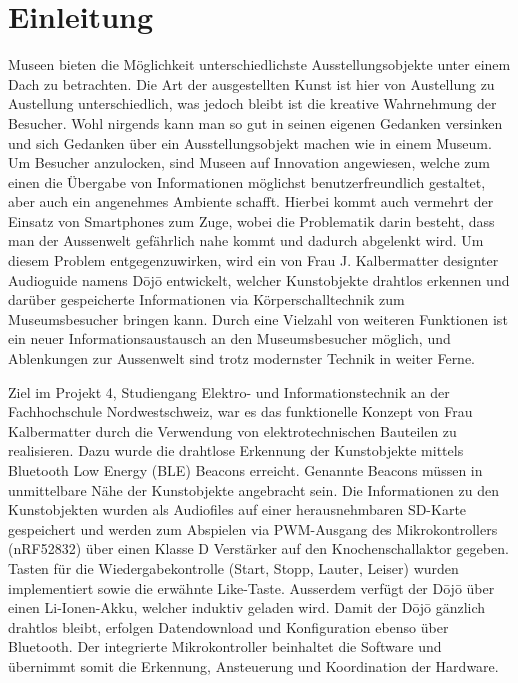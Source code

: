 \section{Einleitung}\label{sec:einleitung}

Museen bieten die Möglichkeit unterschiedlichste Ausstellungsobjekte unter einem Dach zu betrachten. Die Art der ausgestellten Kunst ist hier von Austellung zu Austellung unterschiedlich, was jedoch bleibt ist die kreative Wahrnehmung der Besucher. Wohl nirgends kann man so gut in seinen eigenen Gedanken versinken und sich Gedanken über ein Ausstellungsobjekt machen wie in einem Museum. Um Besucher anzulocken, sind Museen auf Innovation angewiesen, welche zum einen die Übergabe von Informationen möglichst benutzerfreundlich gestaltet, aber auch ein angenehmes Ambiente schafft. Hierbei kommt auch vermehrt der Einsatz von Smartphones zum Zuge, wobei die Problematik darin besteht, dass man der Aussenwelt gefährlich nahe kommt und dadurch abgelenkt wird. Um diesem Problem entgegenzuwirken, wird ein von Frau J. Kalbermatter designter Audioguide namens Dōjō entwickelt, welcher Kunstobjekte drahtlos erkennen und darüber gespeicherte Informationen via Körperschalltechnik zum Museumsbesucher bringen kann. Durch eine Vielzahl von weiteren Funktionen ist ein neuer Informationsaustausch an den Museumsbesucher möglich, und Ablenkungen zur Aussenwelt sind trotz modernster Technik in weiter Ferne.
 
Ziel im Projekt 4, Studiengang Elektro- und Informationstechnik an der Fachhochschule Nordwestschweiz, war es das funktionelle Konzept von Frau Kalbermatter durch die Verwendung von elektrotechnischen Bauteilen zu realisieren. Dazu wurde die drahtlose Erkennung der Kunstobjekte mittels Bluetooth Low Energy (BLE) Beacons erreicht. Genannte Beacons müssen in unmittelbare Nähe der Kunstobjekte angebracht sein. Die Informationen zu den Kunstobjekten wurden als Audiofiles auf einer herausnehmbaren SD-Karte gespeichert und werden zum Abspielen via PWM-Ausgang des Mikrokontrollers (nRF52832) über einen Klasse D Verstärker auf den Knochenschallaktor gegeben. Tasten für die Wiedergabekontrolle (Start, Stopp, Lauter, Leiser) wurden implementiert sowie die erwähnte \glqq Like\grqq -Taste. Ausserdem verfügt der Dōjō über einen Li-Ionen-Akku, welcher induktiv geladen wird. Damit der Dōjō gänzlich drahtlos bleibt, erfolgen Datendownload und Konfiguration ebenso über Bluetooth. Der integrierte Mikrokontroller beinhaltet die Software und übernimmt somit die Erkennung, Ansteuerung und Koordination der Hardware.
 
